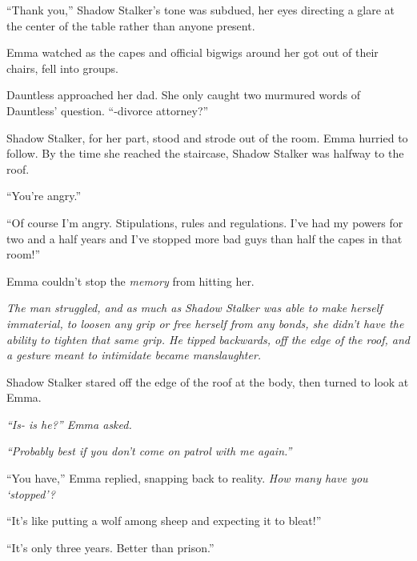 ``Thank you,'' Shadow Stalker's tone was subdued, her eyes directing a glare at the center of the table rather than anyone present.



Emma watched as the capes and official bigwigs around her got out of their chairs, fell into groups.



Dauntless approached her dad.  She only caught two murmured words of Dauntless' question.  ``-divorce attorney?''



Shadow Stalker, for her part, stood and strode out of the room.  Emma hurried to follow.  By the time she reached the staircase, Shadow Stalker was halfway to the roof.



``You're angry.''



``Of course I'm angry.  Stipulations, rules and regulations.  I've had my powers for two and a half years and I've stopped more bad guys than half the capes in that room!''



Emma couldn't stop the \emph{memory} from hitting her.



\emph{The man struggled, and as much as Shadow Stalker was able to make herself immaterial, to loosen any grip or free herself from any bonds, she didn't have the ability to tighten that same grip.  He tipped backwards, off the edge of the roof, and a gesture meant to intimidate became manslaughter.}



Shadow Stalker stared off the edge of the roof at the body, then turned to look at Emma.



\emph{``Is- is he?''  Emma asked.}



\emph{``Probably best if you don't come on patrol with me again.''}



``You have,'' Emma replied, snapping back to reality.  \emph{How many have you `stopped'?}



``It's like putting a wolf among sheep and expecting it to bleat!''



``It's only three years.  Better than prison.''



